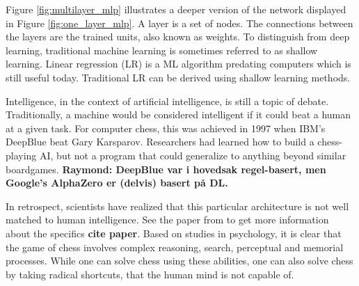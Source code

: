
Figure \ref{fig:multilayer_mlp} illustrates a deeper version of the network displayed in Figure \ref{fig:one_layer_mlp}. A layer is a set of nodes. The connections between the layers are the trained units, also known as weights. To distinguish from deep learning, traditional machine learning is sometimes referred to as shallow learning. Linear regression (LR) is a ML algorithm predating computers which is still useful today. Traditional LR can be derived using shallow learning methods. 

Intelligence, in the context of artificial intelligence, is still a topic of debate. Traditionally, a machine would be considered intelligent if it could beat a human at a given task. For computer chess, this was achieved in 1997 when IBM's DeepBlue beat Gary Karsparov. Researchers had learned how to build a chess-playing AI, but not a program that could generalize to anything beyond similar boardgames. \textbf{Raymond: DeepBlue var i hovedsak regel-basert, men Google's AlphaZero er (delvis) basert på DL.}

In retrospect, scientists have realized that this particular architecture is not well matched to human intelligence. See the paper from to get more information about the specifics \textbf{cite paper}. Based on studies in psychology, it is clear that the game of chess involves complex reasoning, search, perceptual and memorial processes. While one can solve chess using these abilities, one can also solve chess by taking radical shortcuts, that the human mind is not capable of. 

